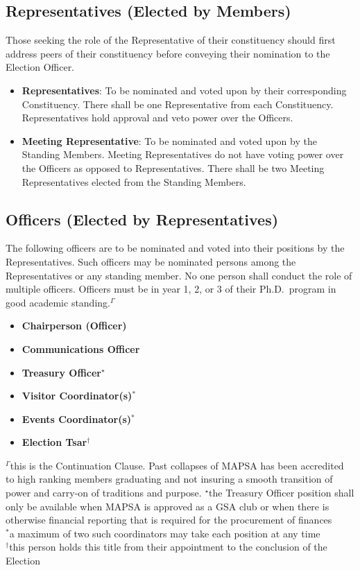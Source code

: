 \documentclass[8pt]{article}
\begin{document}
	\subsection{Representatives (Elected by Members)}
	Those seeking the role of the Representative of their constituency should first address peers of their constituency before conveying their nomination to the Election Officer. 
	\begin{itemize}
		\item \textbf{Representatives}: To be nominated and voted upon by their corresponding Constituency. There shall be one Representative from each Constituency. Representatives hold approval and veto power over the Officers.
		\item \textbf{Meeting Representative}: To be nominated and voted upon by the Standing Members. Meeting Representatives do not have voting power over the Officers as opposed to Representatives. There shall be two Meeting Representatives elected from the Standing Members.
	\end{itemize}
	\subsection{Officers (Elected by Representatives)}
	The following officers are to be nominated and voted into their positions by the Representatives. Such officers may be nominated persons among the Representatives or any standing member. No one person shall conduct the role of multiple officers. Officers must be in year 1, 2, or 3 of their Ph.D.~program in good academic standing.$^\Gamma$
	\begin{itemize}
		\item \textbf{Chairperson (Officer)}
		\item \textbf{Communications Officer}
		\item \textbf{Treasury Officer$^\star$}
		\item \textbf{Visitor Coordinator(s)$^*$}
		\item \textbf{Events Coordinator(s)$^*$}
		\item \textbf{Election Tsar$^\dagger$}
	\end{itemize}
	$^\Gamma$this is the Continuation Clause. Past collapses of MAPSA has been accredited to high ranking members graduating and not insuring a smooth transition of power and carry-on of traditions and purpose.
	$^\star$the Treasury Officer position shall only be available when MAPSA is approved as a GSA club or when there is otherwise financial reporting that is required for the procurement of finances\\
	$^*$a maximum of two such coordinators may take each position at any time\\
	$^\dagger$this person holds this title from their appointment to the conclusion of the Election
\end{document}
